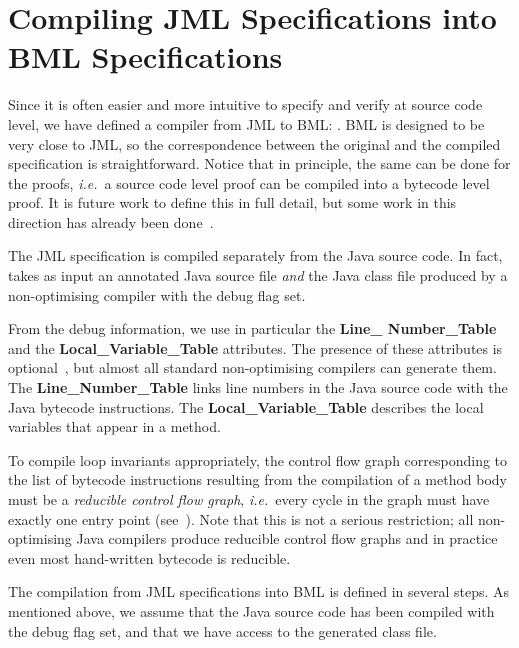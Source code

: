 \section{Compiling JML Specifications into BML Specifications}\label{SecJMLtoBML} 

Since it is often easier and more intuitive to specify and verify at
source code level, we have defined a compiler from JML to BML:
\JMLtoBML. BML is designed to be very close to JML, so the
correspondence between the original and the compiled specification
is straightforward. Notice that in principle, the same can be
done for the proofs,
\emph{i.e.}\ a source code level proof can be compiled into a
bytecode level proof. It is future work to define this in full detail,
but some work in this direction has already been
done~\cite{BartheRS05}.

The JML specification is compiled separately from the Java source
code. In fact, \JMLtoBML takes as input an annotated Java source file
\emph{and} the Java class file produced by a non-optimising compiler
with the debug flag set. %

From the debug information, we use in particular the
\textbf{Line\_ Number\_Table} and the \textbf{Local\_Variable\_Table}
attributes. The presence of these attributes is
optional~\cite{JVMspec}, but almost all standard non-optimising
compilers can generate them. The \textbf{Line\_Number\_Table} links
line numbers in the Java source code with the Java bytecode
instructions.  The
\textbf{Local\_Variable\_Table} describes the local variables that
appear in a method.  

To compile loop invariants appropriately, the control flow graph
corresponding to the list of bytecode instructions resulting from the
compilation of a method body must be a
\emph{reducible control flow graph}, \emph{i.e.}\ every 
cycle in the graph must have exactly one entry point
(see~\cite{AhoSU86}). Note that this is not a serious restriction; all
non-optimising Java compilers produce reducible control flow graphs
and in practice even most hand-written bytecode is reducible.

The compilation from JML specifications into BML is defined in several
steps. As mentioned above, we assume that the Java source code has
been compiled with the debug flag set, and that we have access to the
generated class file.

